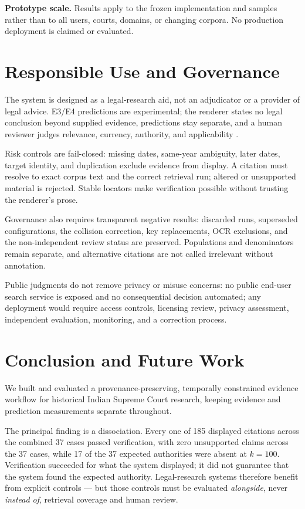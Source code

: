 \documentclass[conference]{IEEEtran}
\begin{document}
\textbf{Prototype scale.} Results apply to the frozen implementation and samples
rather than to all users, courts, domains, or changing corpora. No production
deployment is claimed or evaluated.

\section{Responsible Use and Governance}

The system is designed as a legal-research aid, not an adjudicator or a provider
of legal advice. E3/E4 predictions are experimental; the renderer states no
legal conclusion beyond supplied evidence, predictions stay separate, and a
human reviewer judges relevance, currency, authority, and
applicability \cite{poojasingh2026}.

Risk controls are fail-closed: missing dates, same-year ambiguity,
later dates, target identity, and duplication exclude evidence from display. A
citation must resolve to exact corpus text and the correct retrieval run;
altered or unsupported material is rejected. Stable locators
make verification possible without trusting the renderer's prose.

Governance also requires transparent negative results: discarded
runs, superseded configurations, the collision
correction, key replacements, OCR exclusions, and the non-independent
review status are preserved. Populations and denominators remain
separate, and alternative citations are not called irrelevant without
annotation.

Public judgments do not remove privacy or misuse concerns: no public end-user search
service is exposed and no consequential decision automated;
any deployment would require access controls, licensing review, privacy
assessment, independent evaluation, monitoring, and a correction process.

\section{Conclusion and Future Work}

We built and evaluated a provenance-preserving, temporally constrained evidence
workflow for historical Indian Supreme Court research, keeping evidence and
prediction measurements separate throughout.

The principal finding is a dissociation. Every one of 185 displayed citations
across the combined 37 cases passed verification, with zero unsupported claims
across the 37 cases, while 17 of
the 37 expected authorities were
absent at $k{=}100$. Verification succeeded for what the system displayed; it did not
guarantee that the system found the expected authority. Legal-research systems
therefore benefit from explicit controls ---
but those controls must be evaluated \emph{alongside}, never \emph{instead of},
retrieval coverage and human review.
\end{document}
